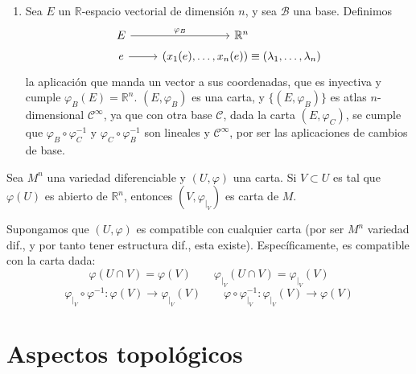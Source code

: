 \begin{ejems}
\begin{enumerate}
    \item Sea $E$ un $\mathbb{R}$-espacio vectorial de dimensión $n$, y sea $\mathcal{B}$ una base. Definimos $$\begin{tikzcd}
    E \arrow{r}{\varphi_B} & \mathbb{R}^n\\[-5mm]
    e \arrow{r} & (x_1(e), \dots, x_n(e)) \equiv (\lambda_1, \dots, \lambda_n)
    \end{tikzcd}
    $$la aplicación que manda un vector a sus coordenadas, que es inyectiva y cumple $\varphi_B(E) = \mathbb{R}^n$. $(E,\varphi_B)$ es una carta, y $\{(E,\varphi_B)\}$ es atlas $n$-dimensional $\mathcal{C}^{\infty}$, ya que con otra base $\mathcal{C}$, dada la carta $(E,\varphi_C)$, se cumple que $\varphi_B \circ \varphi_C^{-1}$ y $\varphi_C \circ \varphi_B^{-1}$ son lineales y $\mathcal{C}^{\infty}$, por ser las aplicaciones de cambios de base.
    \end{enumerate}
    \end{ejems}
    \begin{ejer}
        Sea $M^n$ una variedad diferenciable y $(U,\varphi)$ una carta. Si $V\subset U$ es tal que $\varphi(U)$ es abierto de $\mathbb R^n$, entonces $(V, \varphi_{|_V})$ es carta de $M$.
    \end{ejer}
    \begin{sol}
        Supongamos que $(U,\varphi)$ es compatible con cualquier carta (por ser $M^n$ variedad dif., y por tanto tener estructura dif., esta existe).
        Espec\'ificamente, es compatible con la carta dada:
        $$\varphi(U\cap V)=\varphi(V) \qquad \varphi_{|_V}(U\cap V)=\varphi_{|_V}(V)$$ $$\varphi_{|_V}\circ \varphi^{-1}: \varphi(V) \longrightarrow \varphi_{|_V}(V) \qquad \varphi\circ \varphi_{|_V}^{-1}: \varphi_{|_V}(V) \longrightarrow \varphi(V)$$
    \end{sol}    
    

\section{Aspectos topológicos}

